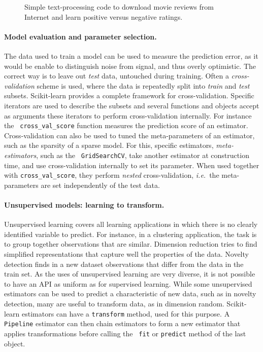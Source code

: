 \documentclass[a4paper]{article}
\begin{document}
\begin{figure}[b]

\caption{Simple text-processing code to download movie reviews from
Internet and learn positive versus negative ratings.\label{fig:code}}
\end{figure}


\paragraph{Model evaluation and parameter selection.}
%
The data used to train a model can be used to measure the prediction
error, as it would be enable to distinguish noise from signal, and thus
overly optimistic. The correct way is to leave out \emph{test} data,
untouched during training. Often a \emph{cross-validation} scheme is
used, where the data is repeatedly split into \emph{train} and
\emph{test} subsets. Scikit-learn provides a complete framework for
cross-validation. Specific iterators are used to describe the subsets and
several functions and objects accept as arguments these iterators to
perform cross-validation internally. For instance the {\tt
cross\_val\_score} function measures the prediction score of an
estimator. Cross-validation can also be used to tuned the meta-parameters
of an estimator, such as the sparsity of a sparse model. For this,
specific estimators, \emph{meta-estimators}, such as the {\tt
GridSearchCV}, take another estimator at construction time, and use
cross-validation internally to set its parameter. When used together with
{\tt cross\_val\_score}, they perform \emph{nested} cross-validation,
\emph{i.e.}~the meta-parameters are set independently of the test data.

\paragraph{Unsupervised models: learning to transform.}
%
Unsupervised learning covers all learning applications in which there is
no clearly identified variable to predict. For instance, in a clustering
application, the task is to group together observations that are similar.
Dimension reduction tries to find simplified representations that capture
well the properties of the data. Novelty detection finds in a new dataset
observations that differ from the data in the train set. As the uses of
unsupervised learning are very diverse, it is not possible to have an API
as uniform as for supervised learning. While some unsupervised
estimators can be used to predict a characteristic of new data, such as
in novelty detection, many are useful to transform data, as in dimension
random. Scikit-learn estimators can have a {\tt transform} method, used
for this purpose. A {\tt Pipeline} estimator can then chain estimators to
form a new estimator that applies transformations before calling the {\tt
fit} or {\tt predict} method of the last object.
\end{document}
